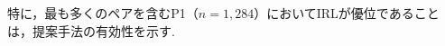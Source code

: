 \documentclass[submit]{ipsj}
\begin{document}
特に，最も多くのペアを含むP1（$n = 1{,}284$）においてIRLが優位であることは，提案手法の有効性を示す.






\end{document}
